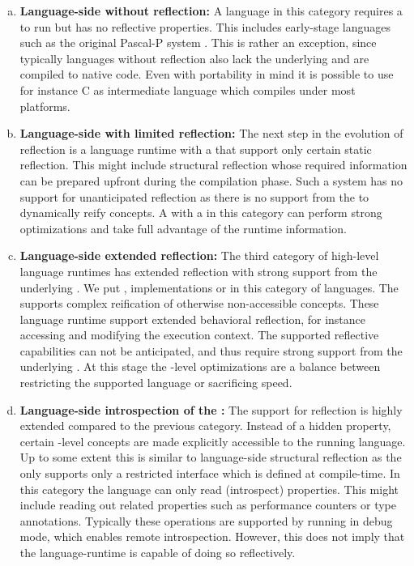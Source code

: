 \begin{enumerate}[a)]
\item \textbf{Language-side without reflection:}
	A language in this category requires a \VM to run but has no reflective properties.
	This includes early-stage languages such as the original Pascal-P system \cite{Nels79a}.
	This is rather an exception, since typically languages without reflection also lack the underlying \VM and are compiled to native code.
	Even with portability in mind it is possible to use for instance C as intermediate language which compiles under most platforms.
	
\item \textbf{Language-side with limited reflection:}
	The next step in the evolution of reflection is a language runtime with a \VM that support only certain static reflection.
	This might include structural reflection whose required information can be prepared upfront during the compilation phase.
	Such a system has no support for unanticipated reflection as there is no support from the \VM to dynamically reify concepts.
	A \VM with a \JIT in this category can perform strong optimizations and take full advantage of the runtime information.
	
\item \textbf{Language-side extended reflection:}
	The third category of high-level language runtimes has extended reflection with strong support from the underlying \VM.
	We put \PH, \ST implementations or \Self in this category of languages.
	The \VM supports complex reification of otherwise non-accessible concepts.
	These language runtime support extended behavioral reflection, for instance accessing and modifying the execution context.
	The supported reflective capabilities can not be anticipated, and thus require strong support from the underlying \VM.
	At this stage the \VM-level optimizations are a balance between restricting the supported language or sacrificing speed.
	
\item \textbf{Language-side introspection of the \VM:}
	The \VM support for reflection is highly extended compared to the previous category.
	Instead of a hidden property, certain \VM-level concepts are made explicitly accessible to the running language.
	Up to some extent this is similar to language-side structural reflection as the \VM only supports only a restricted interface which is defined at compile-time.
	In this category the language can only read (introspect) \VM properties.
	This might include reading out \JIT related properties such as performance counters or type annotations.
	Typically these operations are supported by \VMs running in debug mode, which enables remote introspection.
	However, this does not imply that the language-runtime is capable of doing so reflectively.


\end{enumerate}
